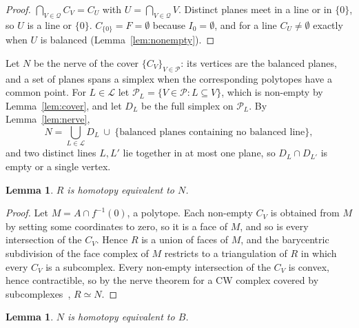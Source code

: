 \documentclass[11pt]{amsart}
\newtheorem{lemma}[theorem]{Lemma}
\theoremstyle{remark}
\begin{document}
\begin{proof}
$\bigcap_{V\in\mathcal Q}C_V=C_U$ with $U=\bigcap_{V\in\mathcal Q}V$. Distinct planes meet in a line or in $\{0\}$,
so $U$ is a line or $\{0\}$. $C_{\{0\}}=F=\emptyset$ because $I_0=\emptyset$, and for a line $C_U\ne\emptyset$ exactly
when $U$ is balanced (Lemma~\ref{lem:nonempty}).
\end{proof}

Let $N$ be the nerve of the cover $\{C_V\}_{V\in\mathcal P}$: its vertices are the balanced planes, and a set of
planes spans a simplex when the corresponding polytopes have a common point. For $L\in\mathcal L$ let
$\mathcal P_L=\{V\in\mathcal P: L\subseteq V\}$, which is non-empty by Lemma~\ref{lem:cover}, and let $D_L$ be the full
simplex on $\mathcal P_L$. By Lemma~\ref{lem:nerve},
\begin{equation}\label{eq:N}
N=\bigcup_{L\in\mathcal L}D_L\ \cup\ \{\text{balanced planes containing no balanced line}\},
\end{equation}
and two distinct lines $L,L'$ lie together in at most one plane, so $D_L\cap D_{L'}$ is empty or a single vertex.

\begin{lemma}\label{lem:RN}
$R$ is homotopy equivalent to $N$.
\end{lemma}

\begin{proof}
Let $M=A\cap f^{-1}(0)$, a polytope. Each non-empty $C_V$ is obtained from $M$ by setting some coordinates to zero,
so it is a face of $M$, and so is every intersection of the $C_V$. Hence $R$ is a union of faces of $M$, and the
barycentric subdivision of the face complex of $M$ restricts to a triangulation of $R$ in which every $C_V$ is a
subcomplex. Every non-empty intersection of the $C_V$ is convex,
hence contractible, so by the nerve theorem for a CW complex covered by subcomplexes~\cite[Corollary~4G.3 and
Exercise~4 of Section~4.G]{Hat02}, $R\simeq N$.
\end{proof}

\begin{lemma}\label{lem:NB}
$N$ is homotopy equivalent to $B$.
\end{lemma}
\end{document}
